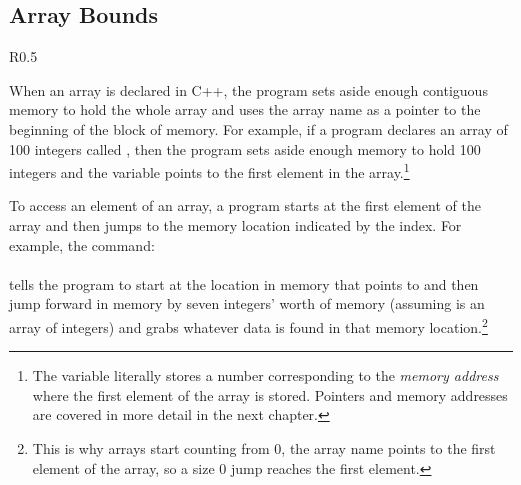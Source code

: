 \subsection{Array Bounds}

\begin{wrapfigure}{R}{0.5\textwidth} 
\vspace{-0.5cm}
\end{wrapfigure}

When an array is declared in C++, the program sets aside enough contiguous memory to hold the whole array and uses the array name as a pointer to the beginning of the block of memory.  For example, if a program declares an array of 100 integers called , then the program sets aside enough memory to hold 100 integers and the variable  points to the first element in the array.\footnote{The variable literally stores a number corresponding to the \emph{memory address} where the first element of the array is stored.  Pointers and memory addresses are covered in more detail in the next chapter.}

To access an element of an array, a program starts at the first element of the array and then jumps to the memory location indicated by the index.  For example, the command:\\
\\
tells the program to start at the location in memory that  points to and then jump forward in memory by seven integers' worth of memory (assuming  is an array of integers) and grabs whatever data is found in that memory location.\footnote{This is why arrays start counting from 0, the array name points to the first element of the array, so a size 0 jump reaches the first element.}

